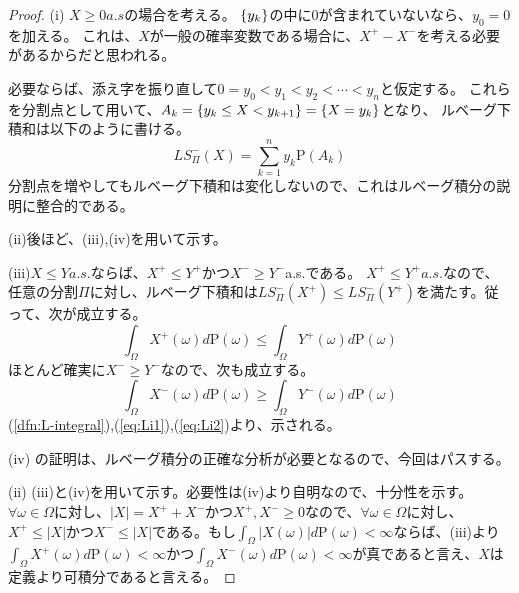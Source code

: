 \documentclass{ltjsarticle}
\numberwithin{equation}{subsection}
\theoremstyle{definition}
\begin{document}
\begin{proof}
    (i) $X \geq 0 a.s$の場合を考える。
        $\qty{y_k}$の中に$0$が含まれていないなら、$y_0=0$を加える。
        これは、$X$が一般の確率変数である場合に、$X^+ - X^-$を考える必要があるからだと思われる。

        必要ならば、添え字を振り直して$0=y_0 < y_1 < y_2 < \cdots < y_n$と仮定する。
        これらを分割点として用いて、$A_k = \qty{y_k \leq X < y_{k+1}} = \qty{X=y_k}$となり、
        ルベーグ下積和は以下のように書ける。
        \begin{equation}
            LS_{\Pi}^{-}(X) = \sum_{k=1}^{n} y_k \mathrm{P} (A_k)
        \end{equation}
        分割点を増やしてもルベーグ下積和は変化しないので、これはルベーグ積分の説明に整合的である。


    (ii)後ほど、(iii),(iv)を用いて示す。


    (iii)$X \leq Y a.s.$ならば、$X^+ \leq Y^+$かつ$X^- \geq Y^-$a.s.である。
    $X^+ \leq Y^+ a.s.$なので、任意の分割$\Pi$に対し、ルベーグ下積和は$LS_{\Pi}^{-}(X^+) \leq LS_{\Pi}^{-}(Y^+)$を満たす。従って、次が成立する。
    \begin{equation}
        \label{eq:Li1}
        \int_{\Omega} X^+(\omega) d\mathrm{P} (\omega) \leq \int_{\Omega} Y^+(\omega) d\mathrm{P} (\omega)
    \end{equation}
    ほとんど確実に$X^- \geq Y^-$なので、次も成立する。
    \begin{equation}
        \label{eq:Li2}
        \int_{\Omega} X^-(\omega) d\mathrm{P} (\omega) \geq \int_{\Omega} Y^-(\omega) d\mathrm{P} (\omega)
    \end{equation}
    (\ref{dfn:L-integral}),(\ref{eq:Li1}),(\ref{eq:Li2})より、示される。


    (iv) の証明は、ルベーグ積分の正確な分析が必要となるので、今回はパスする。


    (ii) (iii)と(iv)を用いて示す。必要性は(iv)より自明なので、十分性を示す。$\forall \omega \in \Omega$に対し、$|X|=X^+ + X^-$かつ$X^+, X^- \geq 0$なので、$\forall \omega \in \Omega$に対し、$X^+ \leq |X|$かつ$X^- \leq |X|$である。もし$\int_{\Omega} |X(\omega)| d\mathrm{P} (\omega) < \infty$ならば、(iii)より$\int_{\Omega} X^+(\omega) d\mathrm{P} (\omega) < \infty$かつ$\int_{\Omega} X^-(\omega) d\mathrm{P} (\omega) < \infty$が真であると言え、$X$は定義より可積分であると言える。
\end{proof}
\end{document}
